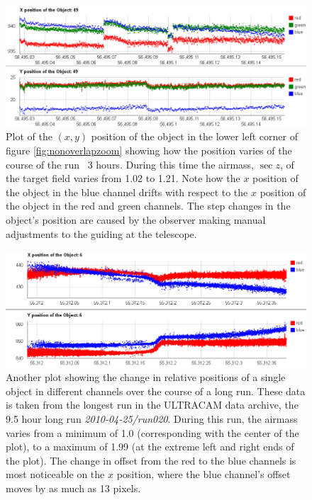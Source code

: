 \begin{figure}
  \centering
  \includegraphics[width=140mm]{images/position_drift.png}
  \caption{Plot of the $(x, y)$ position of the object in the lower left corner of figure \ref{fig:nonoverlapzoom} showing how the position varies of the course of the run ~3 hours. During this time the airmass, $\sec z$, of the target field varies from 1.02 to 1.21. Note how the $x$ position of the object in the blue channel drifts with respect to the $x$ position of the object in the red and green channels. The step changes in the object's position are caused by the observer making manual adjustments to the guiding at the telescope. }
\label{fig:positiondrift}
\end{figure}

\begin{figure}
  \centering
  \includegraphics[width=140mm]{images/position_drift_longrun.png}
  \caption{Another plot showing the change in relative positions of a single object in different channels over the course of a long run. These data is taken from the longest run in the ULTRACAM data archive, the 9.5 hour long run \emph{2010-04-25/run020}. During this run, the airmass varies from a minimum of 1.0 (corresponding with the center of the plot), to a maximum of 1.99 (at the extreme left and right ends of the plot). The change in offset from the red to the blue channels is most noticeable on the $x$ position, where the blue channel's offset moves by as much as 13 pixels. }
\label{fig:positiondriftlongrun}
\end{figure}

